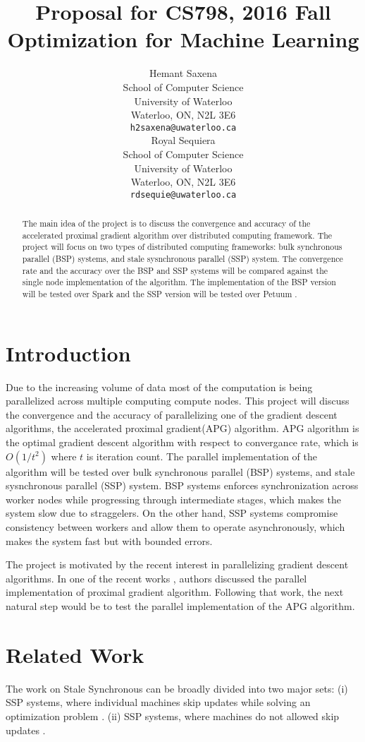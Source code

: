 \documentclass{article}
\title{Proposal for CS798, 2016 Fall\\ \large Optimization for Machine Learning}
\author{
	Hemant Saxena \\
	School of Computer Science\\
	University of Waterloo\\
	Waterloo, ON, N2L 3E6 \\
	\texttt{h2saxena@uwaterloo.ca} \\
	\And
	Royal Sequiera\\
	School of Computer Science\\
	University of Waterloo\\
	Waterloo, ON, N2L 3E6 \\
	\texttt{rdsequie@uwaterloo.ca} \\	
}
\begin{document}
\maketitle

\begin{abstract} 
The main idea of the project is to discuss the convergence and accuracy of the accelerated proximal gradient algorithm \cite{apg} over distributed computing framework.
The project will focus on two types of distributed computing frameworks: bulk synchronous parallel (BSP) systems, and stale sysnchronous parallel (SSP) system.
The convergence rate and the accuracy over the BSP and SSP systems will be compared against the single node implementation of the algorithm.
The implementation of the BSP version will be tested over Spark \cite{spark} and the SSP version will be tested over Petuum \cite{petuum}.
\end{abstract} 

\section{Introduction}
Due to the increasing volume of data most of the computation is being parallelized across multiple computing compute nodes.
This project will discuss the convergence and the accuracy of parallelizing one of the gradient descent algorithms, the accelerated proximal gradient(APG) algorithm.
APG algorithm is the optimal gradient descent algorithm with respect to convergance rate, which is $O(1/t^2)$ where $t$ is iteration count.
The parallel implementation of the algorithm will be tested over bulk synchronous parallel (BSP) systems, and stale sysnchronous parallel (SSP) system.
BSP systems enforces synchronization across worker nodes while progressing through intermediate stages, which makes the system slow due to straggelers.
On the other hand, SSP systems compromise consistency between workers and allow them to operate asynchronously, which makes the system fast but with bounded errors.

The project is motivated by the recent interest in parallelizing gradient descent algorithms.
In one of the recent works \cite{zhou2016convergence}, authors discussed the parallel implementation of proximal gradient algorithm.
Following that work, the next natural step would be to test the parallel implementation of the APG algorithm.

\section{Related Work}
The work on Stale Synchronous can be broadly divided into two major sets: 
(i) SSP systems, where individual machines skip updates while solving an optimization 
problem \cite{feyzmahdavian2014convergence,bertsekas1989convergence,bertsekas1989parallel,tseng1991rate,tsitsiklis1984distributed}. 
(ii) SSP systems, where machines do not allowed skip 
updates \cite{li2014scaling,li2013distributed,li2013parameter,feyzmahdavian2014delayed,ho2013more}.
\end{document}
